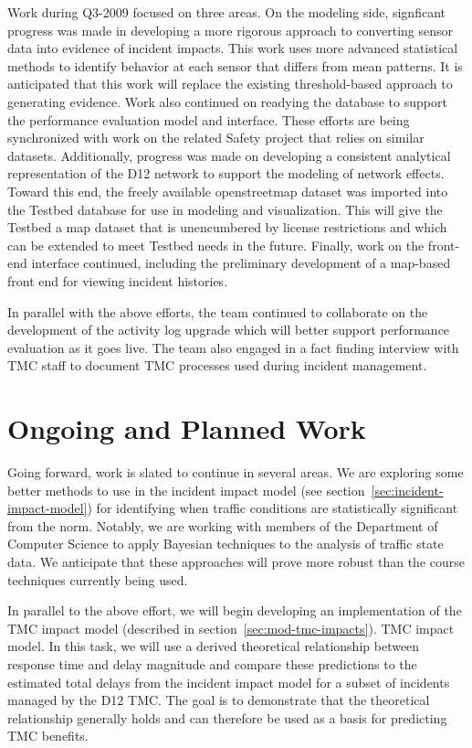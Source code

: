 Work during Q3-2009 focused on three areas.  On the modeling side,
signficant progress was made in developing a more rigorous approach to
converting sensor data into evidence of incident impacts.  This work
uses more advanced statistical methods to identify behavior at each
sensor that differs from mean patterns.  It is anticipated that this
work will replace the existing threshold-based approach to generating
evidence.  Work also continued on readying the database to support the
performance evaluation model and interface.  These efforts are being
synchronized with work on the related Safety project that relies on
similar datasets.  Additionally, progress was made on developing a
consistent analytical representation of the D12 network to support the
modeling of network effects.  Toward this end, the freely available
openstreetmap dataset was imported into the Testbed database for use
in modeling and visualization.  This will give the Testbed a map
dataset that is unencumbered by license restrictions and which can be
extended to meet Testbed needs in the future.  Finally, work on the
front-end interface continued, including the preliminary development
of a map-based front end for viewing incident histories.

In parallel with the above efforts, the team continued to collaborate
on the development of the activity log upgrade which will better
support performance evaluation as it goes live.  The team also engaged
in a fact finding interview with TMC staff to document TMC processes
used during incident management.  


\section*{Ongoing and Planned Work}
\label{execsum-ongoing-work}

Going forward, work is slated to continue in several areas.  We are
exploring some better methods to use in the incident impact model 
%
\iffull
(see section~\ref{sec:incident-impact-model})
\fi
%
for identifying when traffic conditions are statistically significant
from the norm.  Notably, we are working with members of the Department
of Computer Science to apply Bayesian techniques to the analysis of
traffic state data.  We anticipate that these approaches will prove
more robust than the course techniques currently being used.

In parallel to the above effort, we will begin developing an
implementation of the 
\iffull
TMC impact model (described in section~\ref{sec:mod-tmc-impacts}).
\else
TMC impact model.
\fi
%
In this task, we will use a derived theoretical relationship between
response time and delay magnitude and compare these predictions to the
estimated total delays from the incident impact model for a subset of
incidents managed by the D12 TMC.  The goal is to demonstrate that the
theoretical relationship generally holds and can therefore be used as
a basis for predicting TMC benefits.


